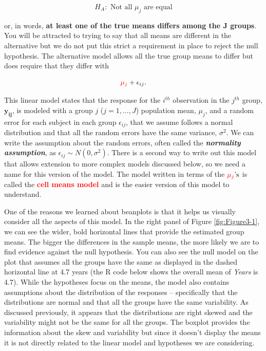 \documentclass[]{book}
\begin{document}
\[H_A: \text{ Not all } \mu_j \text{ are equal}\]

or, in words, \textbf{at least one of the true means differs among the J
groups}. You will be attracted to trying to say that all means are
different in the alternative but we do not put this strict a requirement
in place to reject the null hypothesis. The alternative model allows all
the true group means to differ but does require that they differ with

\[{\color{red}{\mu_j}}+\epsilon_{ij}.\]

This linear model states that the response for the \(i^{th}\)
observation in the \(j^{th}\) group, \(\mathbf{y_{ij}}\), is modeled
with a group \(j\) (\(j=1, \ldots, J\)) population mean, \(\mu_j\), and
a random error for each subject in each group \(\epsilon_{ij}\), that we
assume follows a normal distribution and that all the random errors have
the same variance, \(\sigma^2\). We can write the assumption about the
random errors, often called the \textbf{\emph{normality assumption}}, as
\(\epsilon_{ij} \sim N(0,\sigma^2)\). There is a second way to write out
this model that allows extension to more complex models discussed below,
so we need a name for this version of the model. The model written in
terms of the \({\color{red}{\mu_j}}\text{'s}\) is called the
\textcolor{red}{\textbf{cell means model}} and is the easier version of
this model to understand.

One of the reasons we learned about beanplots is that it helps us
visually consider all the aspects of this model. In the right panel of
Figure \ref{fig:Figure3-1}, we can see the wider, bold horizontal lines
that provide the estimated group means. The bigger the differences in
the sample means, the more likely we are to find evidence against the
null hypothesis. You can also see the null model on the plot that
assumes all the groups have the same as displayed in the dashed
horizontal line at 4.7 years (the R code below shows the overall mean of
\emph{Years} is 4.7). While the hypotheses focus on the means, the model
also contains assumptions about the distribution of the responses --
specifically that the distributions are normal and that all the groups
have the same variability. As discussed previously, it appears that the
distributions are right skewed and the variability might not be the same
for all the groups. The boxplot provides the information about the skew
and variability but since it doesn't display the means it is not
directly related to the linear model and hypotheses we are considering.
\end{document}
